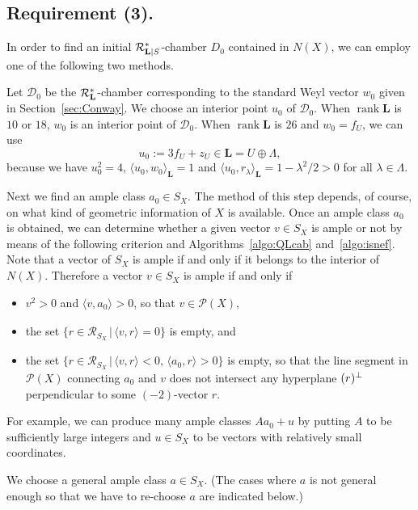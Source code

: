 \documentclass{amsart}
\theoremstyle{plain}
\theoremstyle{definition}
\theoremstyle{remark}
\numberwithin{equation}{section}
\numberwithin{table}{section}
\numberwithin{figure}{section}
\newcommand{\DDD}{\mathord{\mathcal D}}
\newcommand{\PPP}{\mathord{\mathcal P}}
\newcommand{\RRR}{\mathord{\mathcal R}}
\newcommand{\shortset}[2]{\{ {#1} \,|\, {#2}   \}}
\newcommand{\sperp}{\sp{\perp}}
\newcommand{\rank}{\operatorname{\mathrm {rank}}\nolimits}
\renewcommand{\L}{\mathord{\mathbf{L}}}
\newcommand{\intM}[2]{\langle{#1}\rangle_{#2}}
\newcommand{\Roots}{\RRR}
\newcommand{\sphyp}{\sp*}
\newcommand{\RtsLS}{\Roots_{\L|S}}
\newcommand{\Nc}{N}
\begin{document}
\subsection{Requirement (3).}\label{subsec:req3}
%
In order to find an initial $\RtsLS\sphyp$-chamber $D_0$
contained in $\Nc(X)$, 
we can employ one of the following two methods. %
\par
Let $\DDD_0$
be the $\Roots_{\L}\sphyp$-chamber
corresponding to 
the standard Weyl vector $w_0$ given in Section~\ref{sec:Conway}.
We choose an interior point $u_0$ of $\DDD_0$.
When  $\rank \L$ is $10$ or $18$,
$w_0$ is an interior point of $\DDD_0$.
When  $\rank \L$ is $26$ and $w_0=f_U$,
we can use
$$
u_0:=3f_U+z_U \in \L=U\oplus \Lambda,
$$
because we have $u_0^2=4$, $\intM{u_0, w_0}{\L}=1$ and 
$\intM{u_0, r_{\lambda}}{\L}=1-\lambda^2/2>0$ for all $\lambda\in \Lambda$.
\par
Next we find an ample class $a_0\in S_X$.
The method of this step depends, of course,
on what kind of geometric information of $X$ is available.
Once an ample class $a_0$ is obtained,
 we can determine whether a given vector $v\in S_X$
 is ample or not by means of the following criterion and Algorithms~\ref{algo:QLcab} and~\ref{algo:isnef}.
 Note that a vector of $S_X$ is ample if and only if it  belongs to the interior of $N(X)$.
 Therefore
a vector $v\in S_X$ is ample if and only if
 \begin{itemize}
 \item[(i)] $v^2>0$ and $\intM{v, a_0}{}>0$, so that $v\in \PPP(X)$,
 \item[(ii)] the set $\shortset{r\in \Roots_{S_X}}{\intM{v, r}{}=0}$ is empty, and
  \item[(ii)] the set $\shortset{r\in \Roots_{S_X}}{\intM{v, r}{}<0,\, \intM{a_0, r}{}>0}$ is empty, so that the line segment in $\PPP(X)$ connecting $a_0$ and $v$
  does not intersect any hyperplane $(r)\sperp$ perpendicular to some $(-2)$-vector $r$.
 \end{itemize}
 For example,
 we can produce many ample classes $Aa_0+u$
 by putting $A$ to be  sufficiently large integers
 and $u\in S_X$ to be  vectors with relatively small coordinates.
 \par
We choose a general  ample class $a\in S_X$.
(The cases where $a$ is not general enough so that  we have to re-choose $a$ are indicated below.)
\end{document}
